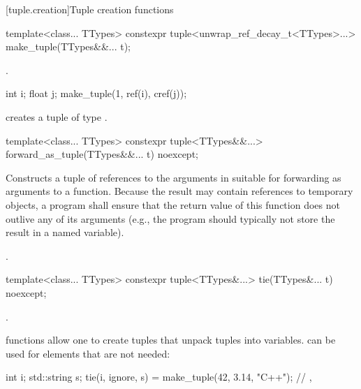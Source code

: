 [tuple.creation]{Tuple creation functions}

%
%
\begin{itemdecl}
template<class... TTypes>
  constexpr tuple<unwrap_ref_decay_t<TTypes>...> make_tuple(TTypes&&... t);
\end{itemdecl}

\begin{itemdescr}
\pnum
\returns
{}.

\pnum
\begin{example}
\begin{codeblock}
int i; float j;
make_tuple(1, ref(i), cref(j));
\end{codeblock}
creates a tuple of type .
\end{example}
\end{itemdescr}

%
%
\begin{itemdecl}
template<class... TTypes>
  constexpr tuple<TTypes&&...> forward_as_tuple(TTypes&&... t) noexcept;
\end{itemdecl}

\begin{itemdescr}
\pnum
\effects
Constructs a tuple of references to the arguments in  suitable
for forwarding as arguments to a function. Because the result may contain references
to temporary objects, a program shall ensure that the return value of this
function does not outlive any of its arguments (e.g., the program should typically
not store the result in a named variable).

\pnum
\returns
{}.
\end{itemdescr}

%
%
%
\begin{itemdecl}
template<class... TTypes>
  constexpr tuple<TTypes&...> tie(TTypes&... t) noexcept;
\end{itemdecl}

\begin{itemdescr}
\pnum
\returns
{}.

\pnum
\begin{example}
 functions allow one to create tuples that unpack
tuples into variables.  can be used for elements that
are not needed:
\begin{codeblock}
int i; std::string s;
tie(i, ignore, s) = make_tuple(42, 3.14, "C++");
// , 
\end{codeblock}
\end{example}
\end{itemdescr}

